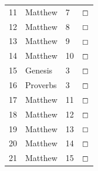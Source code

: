 \documentclass[11pt,landscape,twocolumn,letterpaper]{article}
\begin{document}
\begin{tabular}{p{0.5in}p{1.6in}p{1.3in}p{0.35in}}
  \textcolor[rgb]{0.00,0.00,1.00}{11} & \textcolor[rgb]{0.00,0.00,1.00}{Matthew} & 7 & \textcolor[rgb]{0.00,0.00,1.00}{$\boxempty$}\\

  \textcolor[rgb]{0.00,0.00,1.00}{12} & \textcolor[rgb]{0.00,0.00,1.00}{Matthew} & 8 & \textcolor[rgb]{0.00,0.00,1.00}{$\boxempty$}\\

   \textcolor[rgb]{0.00,0.00,1.00}{13} & \textcolor[rgb]{0.00,0.00,1.00}{Matthew} & 9 & \textcolor[rgb]{0.00,0.00,1.00}{$\boxempty$}\\

  \textcolor[rgb]{0.00,0.00,1.00}{14} & \textcolor[rgb]{0.00,0.00,1.00}{Matthew} & 10 & \textcolor[rgb]{0.00,0.00,1.00}{$\boxempty$}\\

  \textcolor[rgb]{0.00,0.00,1.00}{15} & \textcolor[rgb]{0.00,0.00,1.00}{\textcolor[rgb]{0.98,0.00,0.00}{Genesis}} & \textcolor[rgb]{0.98,0.00,0.00}{3} & \textcolor[rgb]{0.00,0.00,1.00}{$\boxempty$}\\

  \textcolor[rgb]{0.00,0.00,1.00}{16} & \textcolor[rgb]{0.00,0.00,1.00}{\textcolor[rgb]{0.98,0.00,0.00}{Proverbs}} & \textcolor[rgb]{0.98,0.00,0.00}{3} & \textcolor[rgb]{0.00,0.00,1.00}{$\boxempty$}\\

  \textcolor[rgb]{0.00,0.00,1.00}{17} & \textcolor[rgb]{0.00,0.00,1.00}{Matthew} & 11 & \textcolor[rgb]{0.00,0.00,1.00}{$\boxempty$}\\

  \textcolor[rgb]{0.00,0.00,1.00}{18} & \textcolor[rgb]{0.00,0.00,1.00}{Matthew} & 12 & \textcolor[rgb]{0.00,0.00,1.00}{$\boxempty$}\\

  \textcolor[rgb]{0.00,0.00,1.00}{19} & \textcolor[rgb]{0.00,0.00,1.00}{Matthew} & 13 & \textcolor[rgb]{0.00,0.00,1.00}{$\boxempty$}\\

  \textcolor[rgb]{0.00,0.00,1.00}{20} & \textcolor[rgb]{0.00,0.00,1.00}{Matthew} & 14 & \textcolor[rgb]{0.00,0.00,1.00}{$\boxempty$}\\

  \textcolor[rgb]{0.00,0.00,1.00}{21} & \textcolor[rgb]{0.00,0.00,1.00}{Matthew} & 15 & \textcolor[rgb]{0.00,0.00,1.00}{$\boxempty$}\\


\end{tabular}
\end{document}
